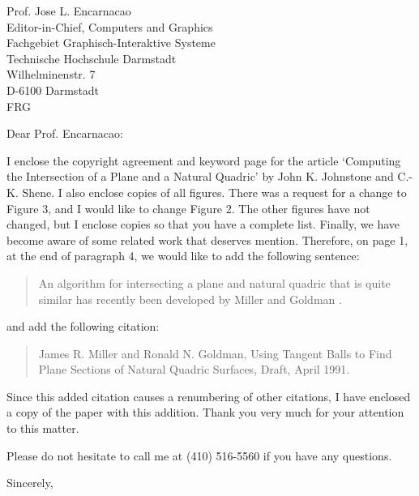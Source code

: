 \signature{John K. Johnstone\\jj@cs.jhu.edu}

\begin{letter}
{Prof. Jose L. Encarnacao\\
Editor-in-Chief, Computers and Graphics\\
Fachgebiet Graphisch-Interaktive Systeme\\
Technische Hochschule Darmstadt\\
Wilhelminenstr. 7\\
D-6100 Darmstadt\\
FRG
}

\opening{Dear Prof. Encarnacao:}

I enclose the copyright agreement and keyword page for the article
`Computing the Intersection of a Plane and a Natural Quadric' by
John K. Johnstone and C.-K. Shene.
I also enclose copies of all figures.
There was a request for a change to Figure 3,
and I would like to change Figure 2.
The other figures have not changed, but I enclose copies so that you have
a complete list.
Finally, we have become aware of some related work that deserves mention.
Therefore, on page 1, at the end of paragraph 4, we would like to add the
following sentence:

\begin{quote}
An algorithm for intersecting a plane and natural quadric that is quite
similar has recently been developed by Miller and Goldman \cite{MiGo91}.
\end{quote}

\noindent and add the following citation:

\begin{quote}
James R. Miller and Ronald N. Goldman, Using Tangent Balls
to Find Plane Sections of Natural Quadric Surfaces, Draft, April 1991.
\end{quote}

\noindent Since this added citation causes a renumbering of other citations,
I have enclosed a copy of the paper with this addition.
Thank you very much for your attention to this matter.

Please do not hesitate to call me at (410) 516-5560 if you have any questions.

\closing{Sincerely,}
\end{letter}


